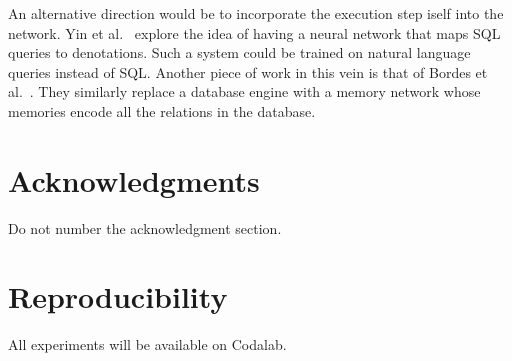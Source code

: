 \documentclass[11pt,letterpaper]{article}
\begin{document}
An alternative direction would be to incorporate the execution
step iself into the network.  Yin et al.~
explore the idea of having a neural network that maps
SQL queries to denotations.  Such a system could be trained
on natural language queries instead of SQL.
Another piece of work in this vein is 
that of Bordes et al.~.
They similarly replace a database engine with a memory network
whose memories encode all the relations in the database.

\section*{Acknowledgments}
Do not number the acknowledgment section.

\section*{Reproducibility}
All experiments will be available on Codalab. 



\end{document}
